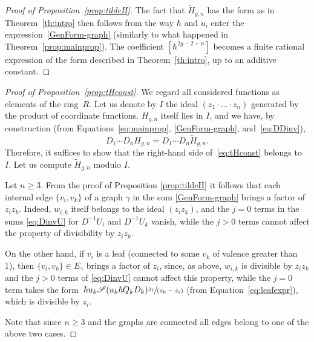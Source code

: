 \documentclass[11pt]{article}
\let\mathcal\mathscr
\newcommand{\spfrac}[2]{\sfrac{#1}{(#2)}}
\theoremstyle{plain}
\theoremstyle{definition}
\theoremstyle{remark}
\newcommand{\cS}{\mathcal{S}}
\begin{document}
\begin{proof}[Proof of Proposition~\ref{prop:tildeH}]
The fact that $\widetilde H_{g,n}$ has the form as in Theorem~\ref{th:intro} then follows from the way $\hbar$ and $u_i$ enter the expression~\eqref{GenForm-graph} (similarly to what happened in Theorem~\ref{prop:mainprop}). The coefficient $[\hbar^{2g-2+n}]$ becomes a finite rational expression of the form described in Theorem~\ref{th:intro}, up to an additive constant.
\end{proof}

\begin{proof}[Proof of Proposition~\ref{prop:tHconst}]
We regard all considered functions as elements of the ring~$R$.
Let us denote by $I$ the ideal $(z_1\cdot\ldots\cdot z_n)$ generated by the product of coordinate functions.
$H_{g,n}$ itself lies in $I$, and we have, by construction (from Equations~\eqref{eq:mainprop}, \eqref{GenForm-graph}, and~\eqref{eq:DDinv}),
\begin{equation*}
D_1\cdots D_n H_{g,n}=D_1\cdots D_n \widetilde H_{g,n}.
\end{equation*}
Therefore, it suffices to show that the right-hand side of~\eqref{eq:tHconst} belongs to~$I$.
Let us compute $\widetilde{H}_{g,n}$ modulo $I$.

Let $n\geq 3$.
From the proof of Proposition \ref{prop:tildeH} it follows that each internal edge $\{v_i,v_k\}$ of a graph $\gamma$ in the sum \eqref{GenForm-graph} brings a factor of $z_i z_k$. Indeed, $w_{i,k}$ itself belongs to the ideal $(z_iz_k)$, and the $j=0$ terms in the sums \eqref{eq:DinvU} for $D^{-1}U_i$ and $D^{-1}U_k$ vanish, while the $j>0$ terms cannot affect the property of divisibility by $z_i z_k$.

On the other hand, if $v_i$ is a leaf (connected to some $v_k$ of valence greater than 1),
then $\{v_i,v_k\}\in E_\gamma$ brings a factor of $z_i$, since, as above, $w_{i,k}$ is divisible by $z_iz_k$ and the $j>0$ terms of \eqref{eq:DinvU} cannot affect this property, while the $j=0$ term takes the form~$\hbar u_k \cS(u_k\hbar Q_kD_k)\spfrac{z_i}{z_k-z_i}$ (from Equation~\eqref{eq:leafexpr}), which is divisible by $z_i$.

Note that since $n\geq 3$ and the graphs are connected all edges belong to one of the above two cases.


\end{proof}
\end{document}
